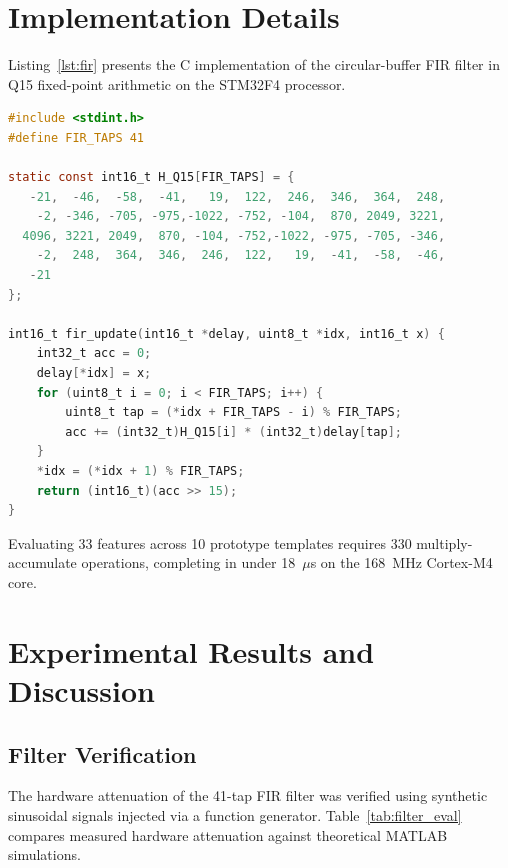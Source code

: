\documentclass[conference]{IEEEtran}
\begin{document}
\section{Implementation Details}
\label{sec:impl}

Listing~\ref{lst:fir} presents the C implementation of the circular-buffer FIR filter in Q15 fixed-point arithmetic on the STM32F4 processor.

\begin{lstlisting}[language=C, caption={Embedded C routine executing circular-buffer FIR convolution.}, label={lst:fir}]
#include <stdint.h>
#define FIR_TAPS 41

static const int16_t H_Q15[FIR_TAPS] = {
   -21,  -46,  -58,  -41,   19,  122,  246,  346,  364,  248,
    -2, -346, -705, -975,-1022, -752, -104,  870, 2049, 3221,
  4096, 3221, 2049,  870, -104, -752,-1022, -975, -705, -346,
    -2,  248,  364,  346,  246,  122,   19,  -41,  -58,  -46,
   -21
};

int16_t fir_update(int16_t *delay, uint8_t *idx, int16_t x) {
    int32_t acc = 0;
    delay[*idx] = x;
    for (uint8_t i = 0; i < FIR_TAPS; i++) {
        uint8_t tap = (*idx + FIR_TAPS - i) % FIR_TAPS;
        acc += (int32_t)H_Q15[i] * (int32_t)delay[tap];
    }
    *idx = (*idx + 1) % FIR_TAPS;
    return (int16_t)(acc >> 15);
}
\end{lstlisting}

Evaluating 33 features across 10 prototype templates requires 330 multiply-accumulate operations, completing in under 18~$\mu$s on the 168~MHz Cortex-M4 core.

\section{Experimental Results and Discussion}
\label{sec:results}

\subsection{Filter Verification}
The hardware attenuation of the 41-tap FIR filter was verified using synthetic sinusoidal signals injected via a function generator. Table~\ref{tab:filter_eval} compares measured hardware attenuation against theoretical MATLAB simulations.
\end{document}
